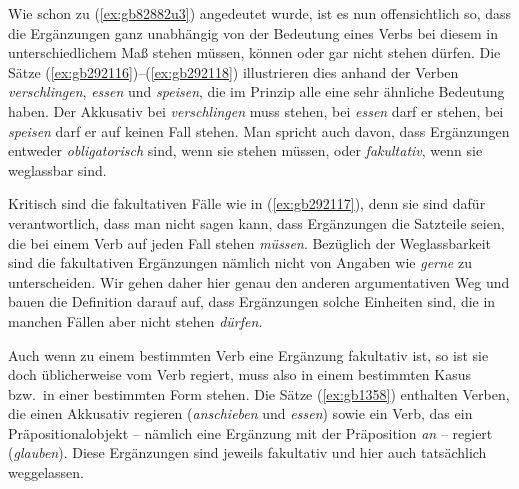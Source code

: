 Wie schon zu (\ref{ex:gb82882u3}) angedeutet wurde, ist es nun offensichtlich so, dass die Ergänzungen ganz unabhängig von der Bedeutung eines Verbs bei diesem in unterschiedlichem Maß stehen müssen, können oder gar nicht stehen dürfen.
Die Sätze (\ref{ex:gb292116})--(\ref{ex:gb292118}) illustrieren dies anhand der Verben \textit{verschlingen}, \textit{essen} und \textit{speisen}, die im Prinzip alle eine sehr ähnliche Bedeutung haben.
Der Akkusativ bei \textit{verschlingen} muss stehen, bei \textit{essen} darf er stehen, bei \textit{speisen} darf er auf keinen Fall stehen.
Man spricht auch davon, dass Ergänzungen entweder \textit{obligatorisch} sind, wenn sie stehen müssen, oder \textit{fakultativ}, wenn sie weglassbar sind.

\begin{exe}
  \ex\label{ex:gb292116}
  \begin{xlist}
  \end{xlist}
  \ex\label{ex:gb292117}
  \begin{xlist}
  \end{xlist}
  \ex\label{ex:gb292118}
  \begin{xlist}
  \end{xlist}
\end{exe}

Kritisch sind die fakultativen Fälle wie in (\ref{ex:gb292117}), denn sie sind dafür verantwortlich, dass man nicht sagen kann, dass Ergänzungen die Satzteile seien, die bei einem Verb auf jeden Fall stehen \textit{müssen}.
Bezüglich der Weglassbarkeit sind die fakultativen Ergänzungen nämlich nicht von Angaben wie \textit{gerne} zu unterscheiden.
Wir gehen daher hier genau den anderen argumentativen Weg und bauen die Definition darauf auf, dass Ergänzungen solche Einheiten sind, die in manchen Fällen aber nicht stehen \textit{dürfen}.

Auch wenn zu einem bestimmten Verb eine Ergänzung fakultativ ist, so ist sie doch üblicherweise vom Verb regiert, muss also in einem bestimmten Kasus bzw.\ in einer bestimmten Form stehen.
Die Sätze (\ref{ex:gb1358}) enthalten Verben, die einen Akkusativ regieren (\textit{anschieben} und \textit{essen}) sowie ein Verb, das ein Präpositionalobjekt -- nämlich eine Ergänzung mit der Präposition \textit{an} -- regiert (\textit{glauben}).
Diese Ergänzungen sind jeweils fakultativ und hier auch tatsächlich weggelassen.

